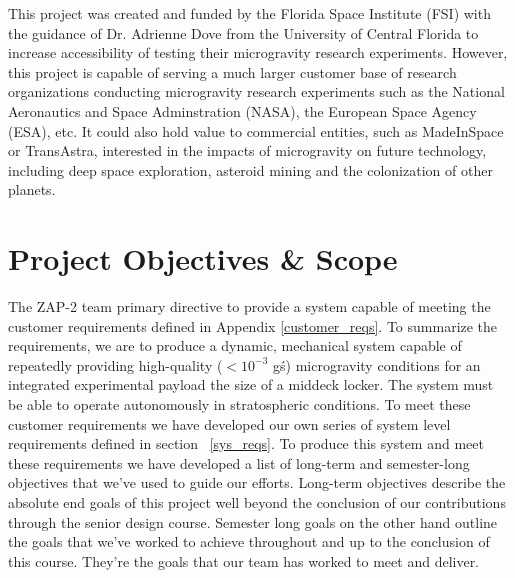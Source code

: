 This project was created and funded by the Florida Space Institute (FSI) with the guidance of Dr. Adrienne Dove from the University of Central Florida to increase accessibility of testing their microgravity research experiments. However, this project is capable of serving a much larger customer base of research organizations conducting microgravity research experiments such as the National Aeronautics and Space Adminstration (NASA), the European Space Agency (ESA), etc. It could also hold value to commercial entities, such as MadeInSpace or TransAstra, interested in the impacts of microgravity on future technology, including deep space exploration, asteroid mining and the colonization of other planets.


\section{Project Objectives \& Scope}

\indent\indent The ZAP-2 team primary directive to provide a system capable of meeting the customer requirements defined in Appendix \ref{customer_reqs}. To summarize the requirements, we are to produce a dynamic, mechanical system capable of repeatedly providing high-quality ($< 10^{-3}$ g\'s) microgravity conditions for an integrated experimental payload the size of a middeck locker. The system must be able to operate autonomously in stratospheric conditions. To meet these customer requirements we have developed our own series of system level requirements defined in section ~\ref{sys_reqs}. To produce this system and meet these requirements we have developed a list of long-term and semester-long objectives that we've used to guide our efforts. Long-term objectives describe the absolute end goals of this project well beyond the conclusion of our contributions through the senior design course. Semester long goals on the other hand outline the goals that we've worked to achieve throughout and up to the conclusion of this course. They're the goals that our team has worked to meet and deliver. 

